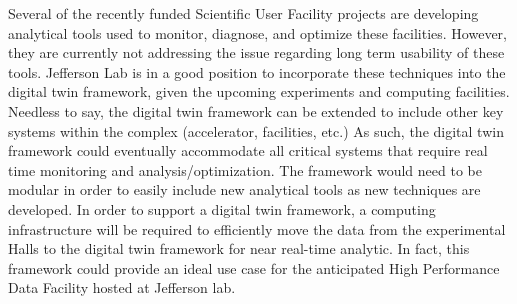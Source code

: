 Several of the recently funded Scientific User Facility projects are developing analytical tools used to monitor, diagnose, and optimize these facilities.
However, they are currently not addressing the issue regarding long term usability of these tools.
Jefferson Lab is in a good position to incorporate these techniques into the digital twin framework, given the upcoming experiments and computing facilities.
Needless to say, the digital twin framework can be extended to include other key systems within the complex (accelerator, facilities, etc.)
As such, the digital twin framework could eventually accommodate all critical systems that require real time monitoring and analysis/optimization.
The framework would need to be modular in order to easily include new analytical tools as new techniques are developed.
In order to support a digital twin framework, a computing infrastructure will be required to efficiently move the data from the experimental Halls to the digital twin framework for near real-time analytic. 
In fact, this framework could provide an ideal use case for the anticipated High Performance Data Facility hosted at Jefferson lab.



